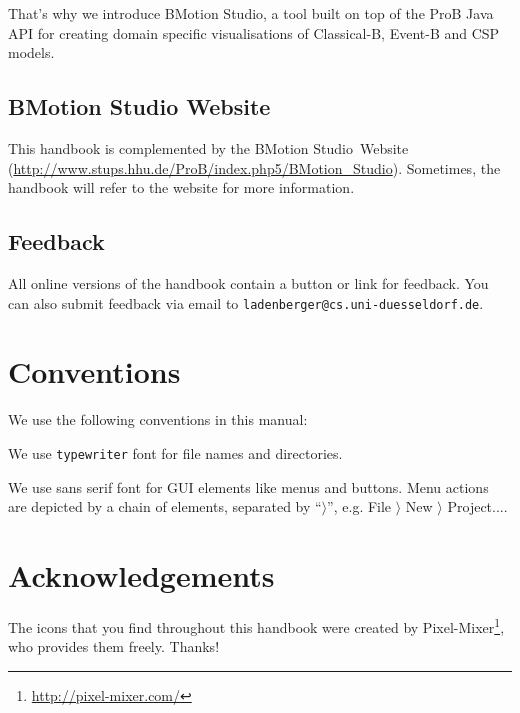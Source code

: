 \documentclass[12pt]{book}
\newcommand{\bms}{BMotion Studio}
\begin{document}
That's why we introduce \bms, a tool built on top of the ProB Java API for creating domain specific visualisations of Classical-B, Event-B and CSP models.

\subsection{BMotion Studio Website}
\label{rodin_wiki}

This handbook is complemented by the \bms~Website (\url{http://www.stups.hhu.de/ProB/index.php5/BMotion_Studio}).  Sometimes, the handbook will refer to the website for more information.

\subsection{Feedback}
\label{feedback}

All online versions of the handbook contain a button or link for feedback.  You can also submit feedback via email to \texttt{ladenberger@cs.uni-duesseldorf.de}.

\section{Conventions}
\label{conventions}

We use the following conventions in this manual:


We use \texttt{typewriter} font for file names and directories.

We use \textsf{sans serif font} for GUI elements like menus and buttons.  Menu actions are depicted by a chain of elements, separated by ``$\rangle$'', e.g. \textsf{File $\rangle$ New $\rangle$ Project...}.

\section{Acknowledgements}
\label{sec:acknowledgements}

The icons that you find throughout this handbook were created by Pixel-Mixer\footnote{\url{http://pixel-mixer.com/}}, who provides them freely.  Thanks!
\end{document}
